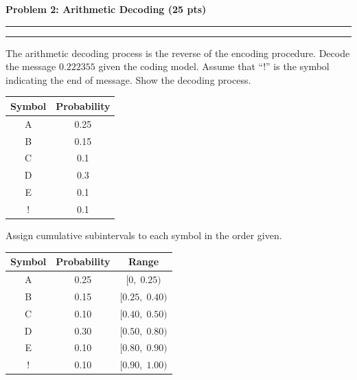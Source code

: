 \documentclass[12pt]{article}
\newcommand{\question}[1]{%
  \clearpage
  \vspace{0.5cm}
  {\noindent\normalsize \textbf{#1}}
  \vspace{0.2cm}
  \hrule
  \vspace{0.1cm}
  \hrule
  \vspace{0.3cm}
}
\begin{document}

\question{Problem 2: Arithmetic Decoding (25 pts)}\label{quest:2}

The arithmetic decoding process is the reverse of the encoding procedure. Decode the message
$0.222355$ given the coding model. Assume that ``!'' is the symbol indicating the end of message.
Show the decoding process.

\vspace{0.3cm}

\begin{center}
\begin{tabular}{cc}
\toprule
\textbf{Symbol} & \textbf{Probability} \\
\midrule
A & 0.25 \\
B & 0.15 \\
C & 0.1 \\
D & 0.3 \\
E & 0.1 \\
! & 0.1 \\
\bottomrule
\end{tabular}
\end{center}

\vspace{0.4cm}

\begin{stepbox}
Assign cumulative subintervals to each symbol in the order given.

\begin{center}
\renewcommand{\arraystretch}{1.15}
\begin{tabular}{|c|c|c|}
\hline
\textbf{Symbol} & \textbf{Probability} & \textbf{Range} \\
\hline
A & 0.25 & $[0,\; 0.25)$ \\
B & 0.15 & $[0.25,\; 0.40)$ \\
C & 0.10 & $[0.40,\; 0.50)$ \\
D & 0.30 & $[0.50,\; 0.80)$ \\
E & 0.10 & $[0.80,\; 0.90)$ \\
! & 0.10 & $[0.90,\; 1.00)$ \\
\hline
\end{tabular}
\end{center}
\end{stepbox}
\end{document}
